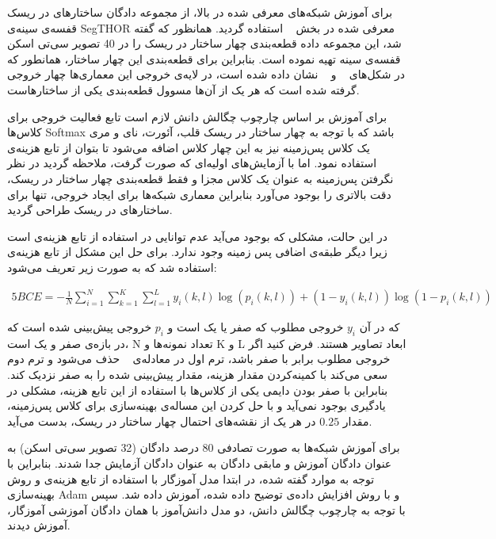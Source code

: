 برای آموزش شبکه‌های معرفی شده در بالا، از مجموعه دادگان ساختارهای در ریسک قفسه‌ی سینه‌ی SegTHOR معرفی شده در بخش ~ استفاده گردید. همانظور که گفته شد، این مجموعه داده قطعه‌بندی چهار ساختار در ریسک را در 40 تصویر سی‌تی اسکن قفسه‌ی سینه تهیه نموده است. بنابراین برای قطعه‌بندی این چهار ساختار، همانطور که در شکل‌های ~ و ~ نشان داده شده است، در لایه‌ی خروجی این معماری‌ها چهار خروجی گرفته شده است که هر یک از آن‌ها مسوول قطعه‌بندی یکی از ساختارهاست.

برای آموزش بر اساس چارچوب چگالش دانش لازم است تابع فعالیت خروجی برای کلاس‌ها Softmax باشد که با توجه به چهار ساختار در ریسک قلب، آئورت، نای و مری یک کلاس پس‌زمینه نیز به این چهار کلاس اضافه می‌شود تا بتوان از تابع هزینه‌ی  استفاده نمود. اما با آزمایش‌های اولیه‌ای که صورت گرفت، ملاحظه گردید در نظر نگرفتن پس‌زمینه به عنوان یک کلاس مجزا و فقط قطعه‌بندی چهار ساختار در ریسک، دقت بالاتری را بوجود می‌آورد بنابراین معماری شبکه‌ها برای ایجاد خروجی، تنها برای ساختارهای در ریسک طراحی گردید.

در این حالت، مشکلی که بوجود می‌آید عدم توانایی در استفاده از تابع هزینه‌ی  است زیرا دیگر طبقه‌ی اضافی پس زمینه وجود ندارد. برای حل این مشکل از تابع هزینه‌ی  استفاده شد که به صورت زیر تعریف می‌شود:

\begin{alignat}{5}
	BCE = -\frac{1}{N}\sum_{i=1}^N \sum_{k=1}^K \sum_{l=1}^L y_i(k,l) \log(p_i(k,l))+(1-y_i(k,l))  \log(1-p_i(k,l))  \label{bce} 
\end{alignat}

که در آن $y_i$ خروجی مطلوب که صفر یا یک است و $p_i$ خروجی پیش‌بینی شده است که در بازه‌ی صفر و یک است، N تعداد نمونه‌ها و K و L ابعاد تصاویر هستند. فرض کنید اگر خروجی مطلوب برابر با صفر باشد، ترم اول در معادله‌ی ~ حذف می‌شود و ترم دوم سعی می‌کند با کمینه‌کردن مقدار هزینه، مقدار پیش‌بینی شده را به صفر نزدیک کند. بنابراین با صفر بودن دایمی یکی از کلاس‌ها با استفاده از این تابع هزینه، مشکلی در یادگیری بوجود نمی‌آید و با حل کردن این مساله‌ی بهینه‌سازی برای کلاس پس‌زمینه، مقدار $0.25$ در هر یک از نقشه‌های احتمال چهار ساختار در ریسک، بدست می‌آید.

برای آموزش شبکه‌ها به صورت تصادفی 80 درصد دادگان (32 تصویر سی‌تی اسکن) به عنوان دادگان آموزش و مابقی دادگان به عنوان دادگان آزمایش جدا شدند. بنابراین با توجه به موارد گفته شده، در ابتدا مدل آموزگار با استفاده از تابع هزینه‌ی  و روش بهینه‌سازی Adam و با روش افزایش داده‌ی توضیح داده شده، آموزش داده شد. سپس با توجه به چارچوب چگالش دانش، دو مدل دانش‌آموز با همان دادگان آموزشی آموزگار، آموزش دیدند.

